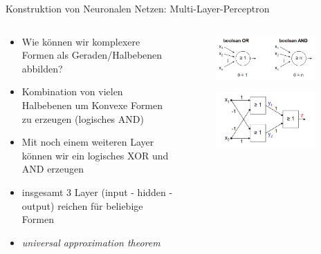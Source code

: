 \documentclass[aspectratio=1610, xcolor=dvipsnames, 9pt]{beamer}
\begin{document}
      \begin{frame}{Konstruktion von Neuronalen Netzen: Multi-Layer-Perceptron}
        \begin{columns}
          \begin{column}{0.7\textwidth}
            \begin{itemize}
              \item Wie können wir komplexere Formen als Geraden/Halbebenen abbilden?
              \item Kombination von vielen Halbebenen um Konvexe Formen zu erzeugen (logisches AND) 
              \item Mit noch einem weiteren Layer können wir ein logisches XOR und AND erzeugen
              \item insgesamt 3 Layer (input - hidden - output) reichen für beliebige Formen
              \item \emph{universal approximation theorem}
            \end{itemize}
          \end{column}
          \begin{column}{0.3\textwidth}
            \begin{figure}
              \centering
                          \includegraphics[width=0.9\textwidth]{images/OR_AND.png}
              \end{figure}
       \begin{figure}
       \centering
                   \includegraphics[width=0.9\textwidth]{images/XOR.png}
       \end{figure}
          \end{column}
        \end{columns}
      \end{frame}
\end{document}
